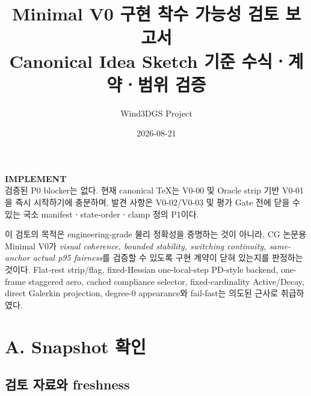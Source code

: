 \documentclass[11pt]{article}
\title{\textbf{Minimal V0 구현 착수 가능성 검토 보고서}\\[0.35em]
\large Canonical Idea Sketch 기준 수식ㆍ계약ㆍ범위 검증}
\author{Wind3DGS Project}
\date{2026-08-21}
\begin{document}
\maketitle

\begin{tcolorbox}[
  colback=SafeLight,
  colframe=SafeGreen,
  title=최종 판정,
  fonttitle=\bfseries
]
\centering
{\Large\textbf{IMPLEMENT}}\\[0.45em]
검증된 P0 blocker는 없다. 현재 canonical TeX는 V0-00 및 Oracle strip 기반 V0-01을
즉시 시작하기에 충분하며, 발견 사항은 V0-02/V0-03 및 평가 Gate 전에 닫을 수 있는
국소 manifestㆍstate-orderㆍclamp 정의 P1이다.
\end{tcolorbox}

\begin{tcolorbox}[
  colback=CoreLight,
  colframe=CoreBlue,
  title=검토 목적과 판정 경계,
  fonttitle=\bfseries
]
이 검토의 목적은 engineering-grade 물리 정확성을 증명하는 것이 아니라,
CG 논문용 Minimal V0가 \emph{visual coherence, bounded stability, switching continuity,
same-anchor actual p95 fairness}를 검증할 수 있도록 구현 계약이 닫혀 있는지를 판정하는 것이다.
Flat-rest strip/flag, fixed-Hessian one-local-step PD-style backend, one-frame staggered aero,
cached compliance selector, fixed-cardinality Active/Decay, direct Galerkin projection,
degree-0 appearance와 fail-fast는 의도된 근사로 취급하였다.
\end{tcolorbox}

\tableofcontents
\newpage

\section{A. Snapshot 확인}

\subsection{검토 자료와 freshness}
\end{document}
